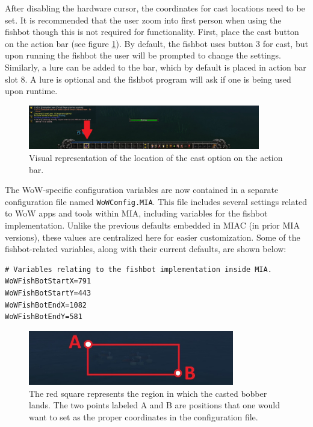 After disabling the hardware cursor, the coordinates for cast locations need to be set. It is recommended that the user zoom into first person when using the fishbot though this is not required for functionality. First, place the cast button on the action bar (see figure \ref{cast bar}). By default, the fishbot uses button 3 for cast, but upon running the fishbot the user will be prompted to change the settings. Similarly, a lure can be added to the bar, which by default is placed in action bar slot 8. A lure is optional and the fishbot program will ask if one is being used upon runtime.

\begin{figure}[h]
	\centering
	\includegraphics[width=0.9\textwidth]{images/WoWScrnShot_040118_234212.jpg}
	\caption{Visual representation of the location of the cast option on the action bar.} \label{cast bar}
\end{figure}

The WoW-specific configuration variables are now contained in a separate configuration file named \texttt{WoWConfig.MIA}. This file includes several settings related to WoW apps and tools within MIA, including variables for the fishbot implementation. Unlike the previous defaults embedded in MIAC (in prior MIA versions), these values are centralized here for easier customization. Some of the fishbot-related variables, along with their current defaults, are shown below:

\begin{lstlisting}[style=pythonstyle]
# Variables relating to the fishbot implementation inside MIA.
WoWFishBotStartX=791
WoWFishBotStartY=443
WoWFishBotEndX=1082
WoWFishBotEndY=581
\end{lstlisting}

\begin{figure}[h]
	\centering
	\includegraphics[width=0.8\textwidth]{images/WoWScrnShot_040118_234212b.jpg}
	\caption{The red square represents the region in which the casted bobber lands. The two points labeled A and B are positions that one would want to set as the proper coordinates in the configuration file.} \label{fishbot square}
\end{figure}

